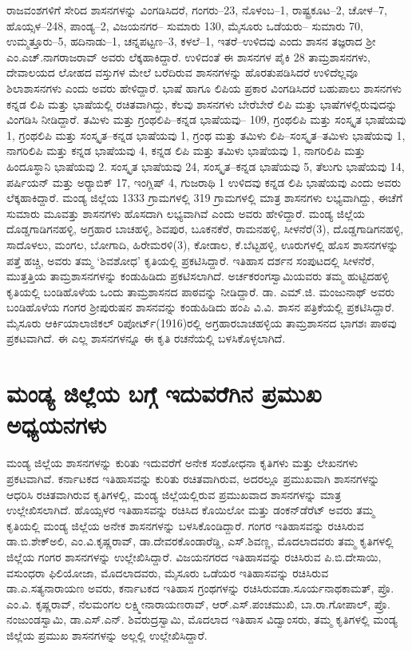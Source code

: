 ರಾಜವಂಶಗಳಿಗೆ ಸೇರಿದ ಶಾಸನಗಳನ್ನು ವಿಂಗಡಿಸಿದರೆ, ಗಂಗರು–23, ನೊಳಂಬ–1, ರಾಷ್ಟ್ರಕೂಟ–2, ಚೋಳ–7, ಹೊಯ್ಸಳ–248, ಪಾಂಡ್ಯ–2, ವಿಜಯನಗರ– ಸುಮಾರು 130, ಮೈಸೂರು ಒಡೆಯರು– ಸುಮಾರು 70, ಉಮ್ಮತ್ತೂರು–5, ಹದಿನಾಡು–1, ಚನ್ನಪಟ್ಟಣ–3, ಕಳಲೆ–1, ಇತರೆ–ಉಳಿದವು ಎಂದು ಶಾಸನ ತಜ್ಞರಾದ ಶ‍್ರೀ ಎಂ.ಎಚ್​.ನಾಗರಾಜರಾವ್​ ಅವರು ಲೆಕ್ಕಹಾಕಿದ್ದಾರೆ. ಉಳಿದಂತೆ ಈ ಶಾಸನಗಳ ಪೈಕಿ 28 ತಾಮ್ರಶಾಸನಗಳು, ದೇವಾಲಯದ ಲೋಹದ ವಸ್ತುಗಳ ಮೇಲೆ ಬರೆದಿರುವ ಶಾಸನಗಳನ್ನು ಹೊರತುಪಡಿಸಿದರೆ ಉಳಿದೆಲ್ಲವೂ ಶಿಲಾಶಾಸನಗಳು ಎಂದು ಅವರು ಹೇಳಿದ್ದಾರೆ. ಭಾಷೆ ಹಾಗೂ ಲಿಪಿಯ ಪ್ರಕಾರ ವಿಂಗಡಿಸಿದರೆ ಬಹುಪಾಲು ಶಾಸನಗಳು ಕನ್ನಡ ಲಿಪಿ ಮತ್ತು ಭಾಷೆಯಲ್ಲಿ ರಚಿತವಾಗಿದ್ದು, ಕೆಲವು ಶಾಸನಗಳು ಬೇರೆಬೇರೆ ಲಿಪಿ ಮತ್ತು ಭಾಷೆಗಳಲ್ಲಿರುವುದನ್ನು ವಿಂಗಡಿಸಿ ನೀಡಿದ್ದಾರೆ. ತಮಿಳು ಮತ್ತು ಗ್ರಂಥಲಿಪಿ–ಕನ್ನಡ ಭಾಷೆಯವು– 109, ಗ್ರಂಥಲಿಪಿ ಮತ್ತು ಸಂಸ್ಕೃತ ಭಾಷೆಯವು 1, ಗ್ರಂಥಲಿಪಿ ಮತ್ತು ಸಂಸ್ಕೃತ–ಕನ್ನಡ ಭಾಷೆಯವು 1, ಗ್ರಂಥ ಮತ್ತು ತಮಿಳು ಲಿಪಿ–ಸಂಸ್ಕೃತ–ತಮಿಳು ಭಾಷೆಯವು 1, ನಾಗರಿಲಿಪಿ ಮತ್ತು ಕನ್ನಡ ಭಾಷೆಯವು 4, ಕನ್ನಡ ಲಿಪಿ ಮತ್ತು ತಮಿಳು ಭಾಷೆಯವು 1, ನಾಗರಿಲಿಪಿ ಮತ್ತು ಹಿಂದೂಸ್ಥಾನಿ ಭಾಷೆಯವು 2. ಸಂಸ್ಕೃತ ಭಾಷೆಯವು 24, ಸಂಸ್ಕೃತ–ಕನ್ನಡ ಭಾಷೆಯವು 5, ತೆಲುಗು ಭಾಷೆಯವು 14, ಪರ್ಷಿಯನ್​ ಮತ್ತು ಅರ‌್ಯಾಬಿಕ್​ 17, ಇಂಗ್ಲಿಷ್​ 4, ಗುಜರಾಥಿ 1 ಉಳಿದವು ಕನ್ನಡ ಲಿಪಿ ಭಾಷೆಯವು ಎಂದು ಅವರು ಲೆಕ್ಕಹಾಕಿದ್ದಾರೆ. ಮಂಡ್ಯ ಜಿಲ್ಲೆಯ 1333 ಗ್ರಾಮಗಳಲ್ಲಿ 319 ಗ್ರಾಮಗಳಲ್ಲಿ ಮಾತ್ರ ಶಾಸನಗಳು ಲಭ್ಯವಾಗಿದ್ದು, ಈಚೆಗೆ ಸುಮಾರು ಮೂವತ್ತು ಶಾಸನಗಳು ಹೊಸದಾಗಿ ಲಭ್ಯವಾಗಿವೆ ಎಂದು ಅವರು ಹೇಳಿದ್ದಾರೆ. ಮಂಡ್ಯ ಜಿಲ್ಲೆಯ ದೊಡ್ಡಗಾಡಿಗನಹಳ್ಳಿ, ಅಗ್ರಹಾರ ಬಾಚಹಳ್ಳಿ, ಶಿವಪುರ, ಬೂಕನಕೆರೆ, ರಾಮನಹಳ್ಳಿ, ಸೀಳನೆರೆ(3), ದೊಡ್ಡಗಾಡಿಗನಹಳ್ಳಿ, ಸಾದೊಳಲು, ಮಂಗಲ, ಬೋಗಾದಿ, ಹಿರೇಮರಳಿ(3), ಕೋಡಾಲ, ಕೆ.ಬೆಟ್ಟಹಳ್ಳಿ, ಊರುಗಳಲ್ಲಿ ಹೊಸ ಶಾಸನಗಳನ್ನು ಪತ್ತೆ ಹಚ್ಚಿ, ಅವರು ತಮ್ಮ ‘ಶಿವಶೋಧ’ ಕೃತಿಯಲ್ಲಿ ಪ್ರಕಟಿಸಿದ್ದಾರೆ. ಇತಿಹಾಸ ದರ್ಶನ ಸಂಪುಟದಲ್ಲಿ ಸೀಳನೆರೆ, ಮುತ್ತತ್ತಿಯ ತಾಮ್ರಶಾಸನಗಳನ್ನು ಕಂಡುಹಿಡಿದು ಪ್ರಕಟಿಸಲಾಗಿದೆ. ಅರ್ಚಕರಂಗಸ್ವಾಮಿಯವರು ತಮ್ಮ ಹುಟ್ಟಿದಹಳ್ಳಿ ಕೃತಿಯಲ್ಲಿ ಬಂಡಿಹೊಳೆಯ ಒಂದು ತಾಮ್ರಶಾಸನದ ಪಾಠವನ್ನು ನೀಡಿದ್ದಾರೆ. ಡಾ. ಎಮ್.ಜಿ. ಮಂಜುನಾಥ್​ ಅವರು ಬಂಡಿಹೊಳೆಯ ಗಂಗರ ಶ‍್ರೀಪುರುಷನ ಶಾಸನವನ್ನು ಕಂಡುಹಿಡಿದು ಹಂಪಿ ವಿ.ವಿ. ಶಾಸನ ಪತ್ರಿಕೆಯಲ್ಲಿ ಪ್ರಕಟಿಸಿದ್ದಾರೆ. ಮೈಸೂರು ಆರ್ಕಿಯಾಲಾಜಿಕಲ್​ ರಿಪೋರ್ಟ್(1916)ರಲ್ಲಿ ಅಗ್ರಹಾರಬಾಚಹಳ್ಳಿಯ ತಾಮ್ರಶಾಸನದ ಭಾಗಶಃ ಪಾಠವು ಪ್ರಕಟವಾಗಿದೆ. ಈ ಎಲ್ಲ ಶಾಸನಗಳನ್ನೂ ಈ ಕೃತಿ ರಚನೆಯಲ್ಲಿ ಬಳಸಿಕೊಳ್ಳಲಾಗಿದೆ.


\section{ಮಂಡ್ಯ ಜಿಲ್ಲೆಯ ಬಗ್ಗೆ ಇದುವರೆಗಿನ ಪ್ರಮುಖ ಅಧ್ಯಯನಗಳು}

ಮಂಡ್ಯ ಜಿಲ್ಲೆಯ ಶಾಸನಗಳನ್ನು ಕುರಿತು ಇದುವರೆಗೆ ಅನೇಕ ಸಂಶೋಧನಾ ಕೃತಿಗಳು ಮತ್ತು ಲೇಖನಗಳು ಪ್ರಕಟವಾಗಿವೆ. ಕರ್ನಾಟಕದ ಇತಿಹಾಸವನ್ನು ಕುರಿತು ರಚಿತವಾಗಿರುವ, ಅದರಲ್ಲೂ ಪ್ರಮುಖವಾಗಿ ಶಾಸನಗಳನ್ನು ಆಧರಿಸಿ ರಚಿತವಾಗಿರುವ ಕೃತಿಗಳಲ್ಲಿ, ಮಂಡ್ಯ ಜಿಲ್ಲೆಯಲ್ಲಿರುವ ಪ್ರಮುಖವಾದ ಶಾಸನಗಳನ್ನು ಮಾತ್ರ ಉಲ್ಲೇಖಿಸಲಾಗಿದೆ. ಹೊಯ್ಸಳರ ಇತಿಹಾಸವನ್ನು ರಚಿಸಿದ ಕೊಯಿಲೋ ಮತ್ತು ಡಂಕನ್​ಡೆರೆಟ್​ ಅವರು ತಮ್ಮ ಕೃತಿಯಲ್ಲಿ ಮಂಡ್ಯ ಜಿಲ್ಲೆಯ ಅನೇಕ ಶಾಸನಗಳನ್ನು ಬಳಸಿಕೊಂಡಿದ್ದಾರೆ. ಗಂಗರ ಇತಿಹಾಸವನ್ನು ರಚಿಸಿರುವ ಡಾ.ಬಿ.ಶೇಕ್​ಅಲಿ, ಎಂ.ವಿ.ಕೃಷ್ಣರಾವ್​, ಡಾ.ದೇವರಕೊಂಡಾರೆಡ್ಡಿ, ಎಸ್​.ಶಿವಣ್ಣ, ಮೊದಲಾದವರು ತಮ್ಮ ಕೃತಿಗಳಲ್ಲಿ ಜಿಲ್ಲೆಯ ಗಂಗರ ಶಾಸನಗಳನ್ನು ಉಲ್ಲೇಖಿಸಿದ್ದಾರೆ. ವಿಜಯನಗರದ ಇತಿಹಾಸವನ್ನು ರಚಿಸಿರುವ ಪಿ.ಬಿ.ದೇಸಾಯಿ, ವಸುಂಧರಾ ಫಿಲಿಯೋಜಾ, ಮೊದಲಾದವರು, ಮೈಸೂರು ಒಡೆಯರ ಇತಿಹಾಸವನ್ನು ರಚಿಸಿರುವ ಡಾ.ಎ.ಸತ್ಯನಾರಾಯಣ ಅವರು, ಕರ್ನಾಟಕದ ಇತಿಹಾಸ ಗ್ರಂಥಗಳನ್ನು ರಚಿಸಿರುವ\break ಡಾ.ಸೂರ್ಯನಾಥಕಾಮತ್​, ಪ್ರೊ. ಎಂ.ವಿ. ಕೃಷ್ಣರಾವ್​, ನೆಲಮಂಗಲ ಲಕ್ಷ್ಮೀನಾರಾಯಣರಾವ್​, ಆರ್​.ಎಸ್​.ಪಂಚಮುಖಿ, ಬಾ.ರಾ.ಗೋಪಾಲ್​, ಪ್ರೊ. ನಂಜುಂಡಸ್ವಾಮಿ, ಡಾ.ಎಸ್​.ಎನ್​. ಶಿವರುದ್ರಸ್ವಾಮಿ, ಮೊದಲಾದ ಇತಿಹಾಸ ವಿದ್ವಾಂಸರು, ತಮ್ಮ ಕೃತಿಗಳಲ್ಲಿ ಮಂಡ್ಯ ಜಿಲ್ಲೆಯ ಪ್ರಮುಖ ಶಾಸನಗಳನ್ನು ಅಲ್ಲಲ್ಲಿ ಉಲ್ಲೇಖಿಸಿದ್ದಾರೆ.

